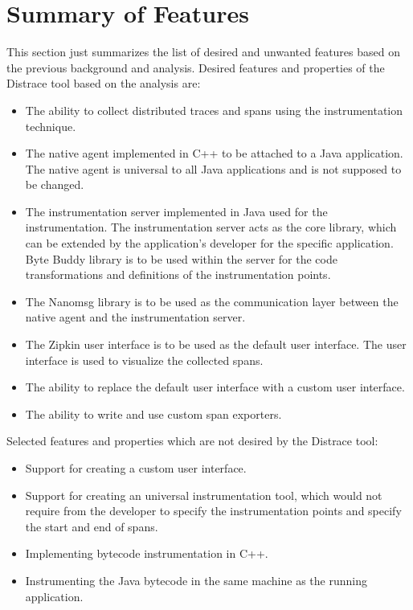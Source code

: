 \section{Summary of Features}
This section just summarizes the list of desired and unwanted features based on the previous background and analysis. Desired features and properties of the Distrace tool based on the analysis are:
\begin{itemize}
	\item The ability to collect distributed traces and spans using the instrumentation technique.
	\item The native agent implemented in C++ to be attached to a Java application. The native agent is universal to all Java applications and is not supposed to be changed.
	\item The instrumentation server implemented in Java used for the instrumentation. The instrumentation server acts as the core library, which can be extended by the application's developer for the specific application. Byte Buddy library is to be used within the server for the code transformations and definitions of the instrumentation points.
	\item The Nanomsg library is to be used as the communication layer between the native agent and the instrumentation server.
	\item The Zipkin user interface is to be used as the default user interface. The user interface is used to visualize the collected spans.
	\item The ability to replace the default user interface with a custom user interface.
	\item The ability to write and use custom span exporters.
\end{itemize}

Selected features and properties which are not desired by the Distrace tool:
\begin{itemize}
	\item Support for creating a custom user interface. 
	\item Support for creating an universal instrumentation tool, which would not require from the developer to specify the instrumentation points and specify the start and end of spans.
	\item Implementing bytecode instrumentation in C++.
	\item Instrumenting the Java bytecode in the same machine as the running application.
\end{itemize}